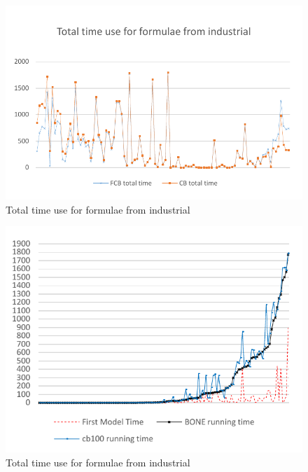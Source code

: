 \begin{figure}
    \centering
    \includegraphics[scale=0.7]{ind.pdf}
   \caption{Total time use for formulae from industrial}
   \label{fig:ind-time}
\end{figure}

\begin{figure}
    \centering
    \includegraphics[scale=0.7]{ind2.pdf}
   \caption{Total time use for formulae from industrial}
   \label{fig:ind-time2}
\end{figure}



